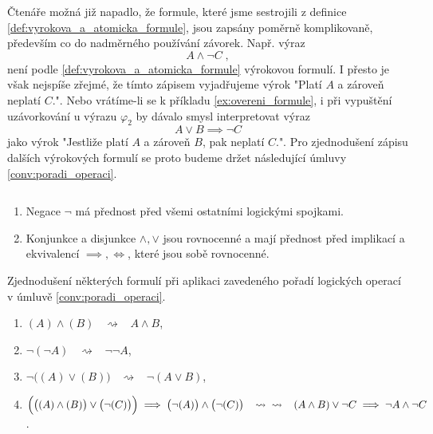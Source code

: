 Čtenáře možná již napadlo, že formule, které jsme sestrojili z definice \ref{def:vyrokova_a_atomicka_formule}, jsou zapsány poměrně komplikovaně, především co do nadměrného používání závorek. Např. výraz
\begin{equation}\label{eq:poradi_operaci}
    A \land \neg C\; ,
\end{equation}
není podle \ref{def:vyrokova_a_atomicka_formule} výrokovou formulí. I přesto je však nejspíše zřejmé, že tímto zápisem vyjadřujeme výrok "Platí $A$ a zároveň neplatí $C$.". Nebo vrátíme-li se k příkladu \ref{ex:overeni_formule}, i při vypuštění uzávorkování u výrazu $\varphi_2$ by dávalo smysl interpretovat výraz
\begin{equation*}\label{eq:vypusteni_uzavorkovani}
    A \lor B \implies \neg C
\end{equation*}
jako výrok "Jestliže platí $A$ a zároveň $B$, pak neplatí $C$.". Pro zjednodušení zápisu dalších výrokových formulí se proto budeme držet následující úmluvy \ref{conv:poradi_operaci}.
\begin{convention}
    \label{conv:poradi_operaci}
    $ $\par
    \begin{enumerate}[label=(\arabic*)]
        \item Negace $\neg$ má přednost před všemi ostatními logickými spojkami.
        \item Konjunkce a disjunkce $\land,\lor$ jsou rovnocenné a mají přednost před implikací a ekvivalencí $\implies,\iff$, které jsou sobě rovnocenné.
    \end{enumerate}
\end{convention}

\begin{example}
    Zjednodušení některých formulí při aplikaci zavedeného pořadí logických operací v úmluvě \ref{conv:poradi_operaci}.
    \begin{enumerate}[label=(\roman*)]
        \item $(A) \land (B)\;\;\;\rightsquigarrow\;\;\; A \land B$,
        \item $\neg(\neg A)\;\;\;\rightsquigarrow\;\;\; \neg\neg A$,
        \item $\neg \big((A) \lor (B)\big)\;\;\; \rightsquigarrow\;\;\; \neg(A \lor B)$,
        \item $\Big(\big((A) \land (B)\big) \lor \big(\neg (C)\big)\Big) \implies \big(\neg (A)\big) \land \big(\neg (C)\big) \;\;\; \rightsquigarrow\\ \rightsquigarrow\;\;\;(A \land B) \lor \neg C \implies \neg A \land \neg C$.
    \end{enumerate}
\end{example}

